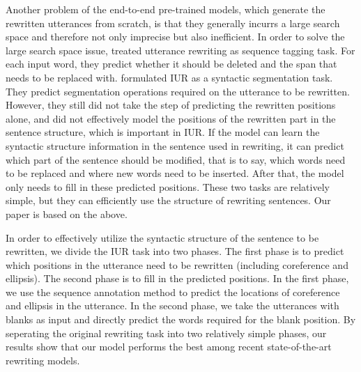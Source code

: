 Another problem of the end-to-end pre-trained models, which generate the rewritten utterances from scratch,
is that they generally incurrs a large search space and therefore not only imprecise but also
inefficient.
In order to solve the large search space issue, %
\citet{hao-etal-2021-rast} treated utterance rewriting as 
sequence tagging task. For each input word, they predict whether it should be deleted and the span that needs to be replaced with. \citet{liu-etal-2020-incomplete} formulated IUR as a syntactic segmentation task. They predict segmentation operations required on the utterance to be rewritten. However, they still did not take the step of predicting the rewritten positions alone, and did not effectively model the positions of the rewritten part in the sentence structure, which is important in IUR. If the model can learn the syntactic structure information in the sentence used in rewriting, it can predict which part of the sentence should be modified, that is to say, which words need to be replaced and where new words need to be inserted. 
After that, the model only needs to fill in these predicted positions. These two tasks are relatively simple, but they can efficiently use the structure of rewriting sentences.
Our 
paper is based on the above.

In order to effectively utilize the syntactic structure of the sentence to be rewritten, we divide the IUR task into two phases. The first phase is to predict which positions in the utterance need to be rewritten (including coreference and ellipsis). The second phase is to fill in the predicted positions. In the first phase, we use the sequence annotation method to predict the locations of coreference and ellipsis in the utterance. In the second phase, we take the 
utterances with blanks as input
and directly predict the words required for the blank position.
By seperating the
original rewriting
task into two relatively simple phases, 
our results show that 
our model performs the best among 
recent state-of-the-art
rewriting models. 

